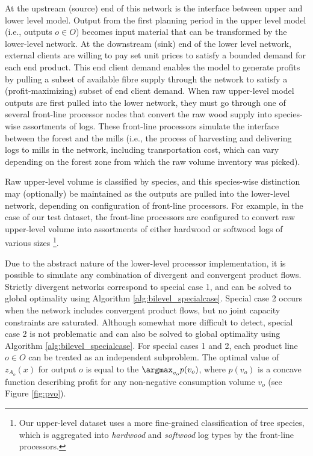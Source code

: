At the upstream (source) end of this network is the interface between upper and lower level model. 
Output from the first planning period in the upper level model (i.e., outputs $o \in O$) becomes input material that can be transformed by the lower-level network. 
At the downstream (sink) end of the lower level network, external clients are willing to pay set unit prices to satisfy a bounded demand for each end product. 
This end client demand enables the model to generate profits by pulling a subset of available fibre supply through the network to satisfy a (profit-maximizing) subset of end client demand.
When raw upper-level model outputs are first pulled into the lower network, they must go through one of several front-line processor nodes that convert the raw wood supply into species-wise assortments of logs. 
These front-line processors simulate the interface between the forest and the mills (i.e., the process of harvesting and delivering logs to mills in the network, including transportation cost, which can vary depending on the forest zone from which the raw volume inventory was picked).

Raw upper-level volume is classified by species, and this species-wise distinction may (optionally) be maintained as the outputs are pulled into the lower-level network, depending on configuration of front-line processors. 
For example, in the case of our test dataset, the front-line processors are configured to convert raw upper-level volume into assortments of either hardwood or softwood logs of various sizes \footnote{Our upper-level dataset uses a more fine-grained classification of tree species, which is aggregated into \emph{hardwood} and \emph{softwood} log types by the front-line processors.}.

Due to the abstract nature of the lower-level processor implementation, it is possible to simulate any combination of divergent and convergent product flows. 
Strictly divergent networks correspond to special case 1, and can be solved to global optimality using Algorithm \ref{alg:bilevel_specialcase}. 
Special case 2 occurs when the network includes convergent product flows, but no joint capacity constraints are saturated. 
Although somewhat more difficult to detect, special case 2 is not problematic and can also be solved to global optimality using Algorithm \ref{alg:bilevel_specialcase}.
For special cases 1 and 2, each product line $o \in O$ can be treated as an independent subproblem. 
The optimal value of $z_{A_o} (x)$ for output $o$ is equal to the $\argmax_{v_o} p(v_o)$, where $p(v_o)$ is a concave function describing profit for any non-negative consumption volume $v_o$ (see Figure \ref{fig:pvo}). 

